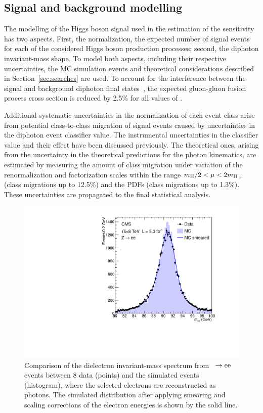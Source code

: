 \documentclass[11pt,twoside,a4paper,cmspaper,final,collab]{cms-tdr}
\begin{document}
\begin{table}[htbp]
\begin{center}
\begin{tabular}
\hline
\end{tabular}

\label{tab:ClassFracs}
\end{center}
\end{table}

\subsection{Signal and background modelling}
\label{sec:hgg_smodeling}



The modelling of the Higgs boson signal used in the estimation of the sensitivity has
two aspects. First, the normalization, \ie the
expected number of signal events for each of the considered Higgs boson production processes;
second, the diphoton invariant-mass shape. To model both aspects, including their respective
uncertainties, the MC simulation events and theoretical considerations described
in Section~\ref{sec:searches} are used. To account for the interference between the signal and
background diphoton final states~\cite{interference}, the expected
gluon-gluon fusion process cross section is reduced by 2.5\% for all
values of \mH.

Additional systematic uncertainties in the normalization of each event class
arise from potential class-to-class migration of signal events caused by
uncertainties in the diphoton event classifier value.
The instrumental uncertainties in the classifier value and their effect have been discussed previously.
The theoretical ones, arising from the uncertainty
in the theoretical predictions for the photon kinematics,
are estimated by measuring the amount of class migration under variation of the renormalization and factorization scales
within the range $m_{\mathrm{H}}/2 < \mu < 2m_{\mathrm{H}}$,
(class migrations up to 12.5\%) and the PDFs (class migrations up to 1.3\%).
These uncertainties are propagated to the final statistical analysis.

\begin{figure}[htbp]
  \begin{center}
    \includegraphics[width=0.55\linewidth]{figures/hgg_resolution.pdf}
    \caption{
      Comparison of the dielectron invariant-mass spectrum from \cPZ~$\to \mathrm{e}\mathrm{e}$ events between 8\TeV
      data (points) and the simulated events (histogram), where the selected electrons are reconstructed as photons.
      The simulated distribution after applying smearing and scaling corrections of the electron energies
      is shown by the solid line.
    }
    \label{fig:hgg_resolution}
  \end{center}
\end{figure}
\end{document}
